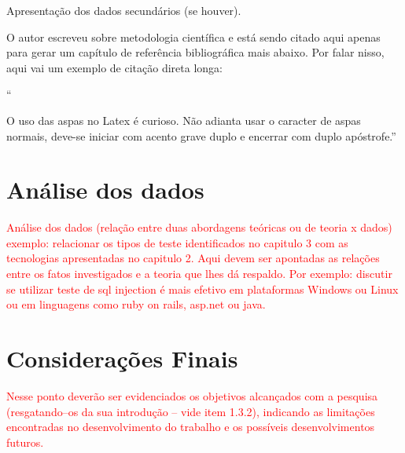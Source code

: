 \documentclass[]{senac-tcc}
\begin{document}
Apresentação dos dados secundários (se houver).

O autor  escreveu sobre metodologia científica e está sendo citado aqui apenas para gerar um capítulo de referência bibliográfica mais abaixo. Por falar nisso, aqui vai um exemplo de citação direta longa:

\begin{citacao}
    ``\lipsum[26]
    
    O uso das aspas no Latex é curioso. Não adianta usar o caracter de aspas normais, deve-se iniciar com acento grave duplo e encerrar com duplo apóstrofe.'' \cite[p.~999, texto inventado]{mascarenhas_2012}
\end{citacao}


\lipsum[20]


\chapter{Análise dos dados}

\textcolor{red}{Análise dos dados (relação entre duas abordagens teóricas ou de teoria x dados) exemplo: relacionar os tipos de teste identificados no capitulo 3 com as tecnologias apresentadas no capitulo 2. Aqui devem ser apontadas as relações entre os fatos investigados e a teoria que lhes dá respaldo. Por exemplo: discutir se utilizar teste de sql injection é mais efetivo em plataformas Windows ou Linux ou em linguagens como ruby on rails, asp.net ou java.}

\lipsum[12-13]

\chapter{Considerações Finais}

\textcolor{red}{Nesse ponto deverão ser evidenciados os objetivos alcançados com a pesquisa (resgatando–os da sua introdução – vide item 1.3.2), indicando as limitações encontradas no desenvolvimento do trabalho e os possíveis desenvolvimentos futuros.}

\lipsum[14-15]

\end{document}
